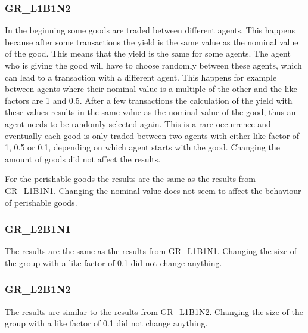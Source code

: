 \documentclass[twoside,openright]{uva-bachelor-thesis}
\begin{document}
\subsubsection{GR\_L1B1N2}
In the beginning some goods are traded between different agents. This happens because after some transactions the yield is the same value as the nominal value of the good. This means that the yield is the same for some agents. The agent who is giving the good will have to choose randomly between these agents, which can lead to a transaction with a different agent. This happens for example between agents where their nominal value is a multiple of the other and the like factors are 1 and 0.5. After a few transactions the calculation of the yield with these values results in the same value as the nominal value of the good, thus an agent needs to be randomly selected again. This is a rare occurrence and eventually each good is only traded between two agents with either like factor of 1, 0.5 or 0.1, depending on which agent starts with the good. Changing the amount of goods did not affect the results.

For the perishable goods the results are the same as the results from GR\_L1B1N1. Changing the nominal value does not seem to affect the behaviour of perishable goods.
\subsubsection{GR\_L2B1N1}
The results are the same as the results from GR\_L1B1N1. Changing the size of the group with a like factor of 0.1 did not change anything. 
\subsubsection{GR\_L2B1N2}
The results are similar to the results from GR\_L1B1N2. Changing the size of the group with a like factor of 0.1 did not change anything. 

\clearpage
\end{document}
